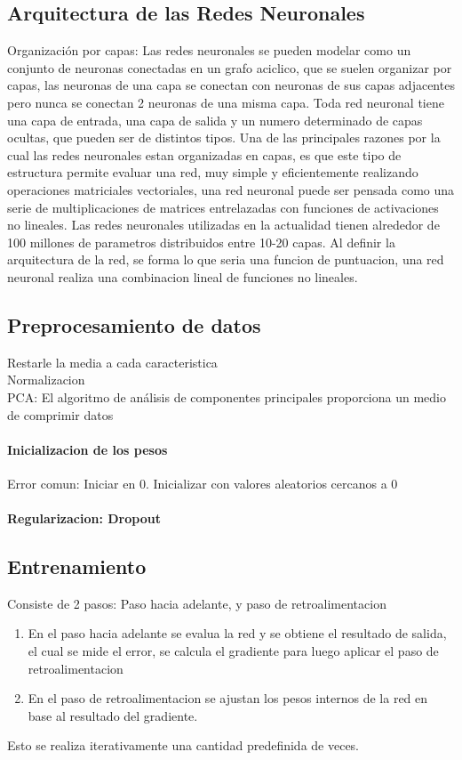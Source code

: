 \documentclass[a4paper,11pt,spanish]{book}
\begin{document}
    \subsection {Arquitectura de las Redes Neuronales}
      Organización por capas: Las redes neuronales se pueden modelar como un conjunto de neuronas conectadas en un grafo aciclico, que se suelen organizar por capas, las neuronas de una capa
      se conectan con neuronas de sus capas adjacentes pero nunca se conectan 2 neuronas de una misma capa.
      Toda red neuronal tiene una capa de entrada, una capa de salida y un numero determinado de capas ocultas, que pueden ser de distintos tipos.
      Una de las principales razones por la cual las redes neuronales estan organizadas en capas, es que este tipo de estructura permite evaluar una red, muy simple y eficientemente realizando
      operaciones matriciales vectoriales, una red neuronal puede ser pensada como una serie de multiplicaciones de matrices entrelazadas con funciones de activaciones no lineales.
      Las redes neuronales utilizadas en la actualidad tienen alrededor de 100 millones de parametros distribuidos entre 10-20 capas.
      Al definir la arquitectura de la red, se forma lo que seria una funcion de puntuacion, una red neuronal realiza una combinacion lineal de funciones no lineales. 

    \subsection {Preprocesamiento de datos}
	Restarle la media a cada caracteristica \\
	Normalizacion \\
	PCA: El algoritmo de análisis de componentes principales proporciona un medio de comprimir datos \\

    \paragraph {Inicializacion de los pesos}
      Error comun: Iniciar en 0.
      Inicializar con valores aleatorios cercanos a 0 

    \paragraph {Regularizacion: Dropout}


    \subsection {Entrenamiento}
      Consiste de 2 pasos: Paso hacia adelante, y paso de retroalimentacion
      \begin{enumerate}
      \item En el paso hacia adelante se evalua la red y se obtiene el resultado de salida, el cual se mide el error, se calcula el gradiente para luego aplicar el paso de retroalimentacion
	\item En el paso de retroalimentacion se ajustan los pesos internos de la red en base al resultado del gradiente.
      \end{enumerate}
      Esto se realiza iterativamente una cantidad predefinida de veces.
\end{document}
